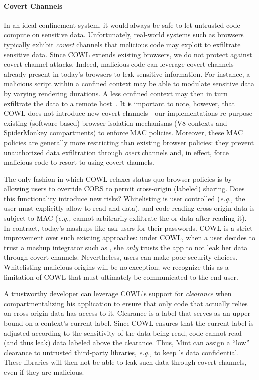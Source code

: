 \paragraph{Covert Channels}
In an ideal confinement system, it would always be safe to let untrusted
code compute on sensitive data.
%
Unfortunately, real-world systems such as browsers typically exhibit
\emph{covert} channels that malicious code may exploit to exfiltrate
sensitive data.
%
Since COWL extends existing browsers, we do not protect against covert
channel attacks.
%
Indeed, malicious code can leverage covert channels already present in
today's browsers to leak sensitive information.
%
For instance, a malicious script within a confined context may be able
to modulate sensitive data by varying rendering durations. A less
confined context may then in turn exfiltrate the data to a remote
host~\cite{kotcher2013cross}.
%
It is important to note, however, that COWL does not introduce new
covert channels---our implementations re-purpose existing
(software-based) browser isolation mechanisms (V8 contexts and
SpiderMonkey compartments) to enforce MAC policies.
%
Moreover, these MAC policies are generally more restricting than
existing browser policies: they prevent unauthorized data exfiltration
through \emph{overt} channels and, in effect, force malicious code to
resort to using covert channels.


The only fashion in which COWL relaxes status-quo browser policies is
by allowing users to override CORS to permit cross-origin (labeled)
sharing.
%
Does this functionality introduce new risks?
%
Whitelisting is user controlled (\emph{e.g.,} the user must explicitly
allow  to read  and
 data), and code reading cross-origin data is subject
to MAC (\emph{e.g.,}  cannot arbitrarily exfiltrate
the  or  data after reading it).
%
In contract, today's mashups like  ask users for their
passwords.
%
COWL is a strict improvement over such existing approaches: under
COWL, when a user decides to trust a mashup integrator such as
, she {\em only} trusts the app to not leak her data
through covert channels.
%
Nevertheless, users can make poor security choices. Whitelisting
malicious origins will be no exception; we recognize this as a
limitation of COWL that must ultimately be communicated to the
end-user.%

A trustworthy developer can leverage COWL's support for
\emph{clearance} when compartmentalizing his application to ensure
that only code that actually relies on cross-origin data has access to
it.
%
Clearance is a label that serves as an upper bound on a context's
current label. Since COWL ensures that the current label is adjusted
according to the sensitivity of the data being read, code cannot read
(and thus leak) data labeled above the clearance.
%
Thus, Mint can assign a ``low'' clearance to untrusted third-party
libraries, {\em e.g.,} to keep 's data confidential.
%
These libraries will then not be able to leak such data through covert
channels, even if they are malicious.

